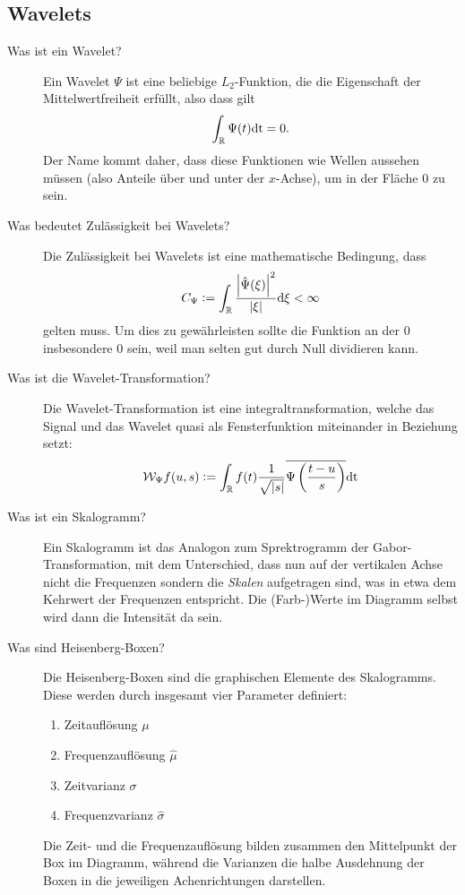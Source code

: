\subsection{Wavelets}
\begin{description}
  \item[Was ist ein Wavelet?]
    Ein Wavelet $\Psi$ ist eine beliebige $L_2$-Funktion, die die Eigenschaft der Mittelwertfreiheit erfüllt, also dass gilt
    $$ \int_{\mathbb{R}} \Psi(t) \text{dt} = 0. $$ Der Name kommt daher, dass diese Funktionen wie Wellen aussehen müssen (also Anteile
    über und unter der $x$-Achse), um in der Fläche $0$ zu sein.
  \item[Was bedeutet Zulässigkeit bei Wavelets?]
    Die Zulässigkeit bei Wavelets ist eine mathematische Bedingung, dass 
    $$ C_\Psi := \int_{\mathbb{R}} \frac{\left|\hat \Psi(\xi)\right|^2}{|\xi|}\text{d} \xi < \infty $$
    gelten muss. Um dies zu gewährleisten sollte die Funktion an der $0$ insbesondere $0$ sein, weil man selten
    gut durch Null dividieren kann.
  \item[Was ist die Wavelet-Transformation?]
    Die Wavelet-Transformation ist eine integraltransformation, welche das Signal und das Wavelet quasi als Fensterfunktion
    miteinander in Beziehung setzt:
    $$ \mathcal{W}_\Psi f(u,s) := \int_{\mathbb{R}} f(t) \frac{1}{\sqrt{|s|}}\overline{\Psi\left(\frac{t-u}{s}\right)}\text{dt} $$
  \item[Was ist ein Skalogramm?]
    Ein Skalogramm ist das Analogon zum Sprektrogramm der Gabor-Transformation, mit dem Unterschied, dass nun auf der
    vertikalen Achse nicht die Frequenzen sondern die \emph{Skalen} aufgetragen sind, was in etwa dem Kehrwert der 
    Frequenzen entspricht. Die (Farb-)Werte im Diagramm selbst wird dann die Intensität da sein.
  \item[Was sind Heisenberg-Boxen?]
    Die Heisenberg-Boxen sind die graphischen Elemente des Skalogramms. Diese werden durch insgesamt vier Parameter 
    definiert:

    \begin{enumerate}
      \item Zeitauflösung $\mu$
      \item Frequenzauflösung $\hat \mu$
      \item Zeitvarianz $\sigma$
      \item Frequenzvarianz $\hat \sigma$
    \end{enumerate}

    Die Zeit- und die Frequenzauflösung bilden zusammen den Mittelpunkt der Box im Diagramm, während die Varianzen
    die halbe Ausdehnung der Boxen in die jeweiligen Achenrichtungen darstellen.


\end{description}
